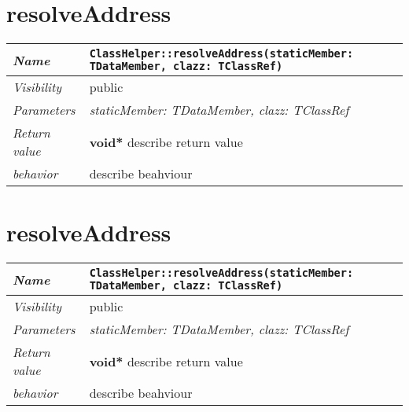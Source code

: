  \section{resolveAddress}
\begin{longtable}{p{3cm} @{\hskip 1cm} p{12cm}}
 \hline
\textit{Name} & \texttt{ClassHelper::resolveAddress(staticMember: TDataMember, clazz: TClassRef)}\\
\hline
 \textit{Visibility} & public\\
\hline
\textit{Parameters} & \textit{staticMember: TDataMember, clazz: TClassRef}\\
\hline
\textit{Return value} & \textbf{ void*} describe return value\\
  \hline
 \textit{behavior} & describe beahviour \\
\hline
\end{longtable} \pagebreak
 \section{resolveAddress}
\begin{longtable}{p{3cm} @{\hskip 1cm} p{12cm}}
 \hline
\textit{Name} & \texttt{ClassHelper::resolveAddress(staticMember: TDataMember, clazz: TClassRef)}\\
\hline
 \textit{Visibility} & public\\
\hline
\textit{Parameters} & \textit{staticMember: TDataMember, clazz: TClassRef}\\
\hline
\textit{Return value} & \textbf{ void*} describe return value\\
  \hline
 \textit{behavior} & describe beahviour \\
\hline
\end{longtable} \pagebreak
 